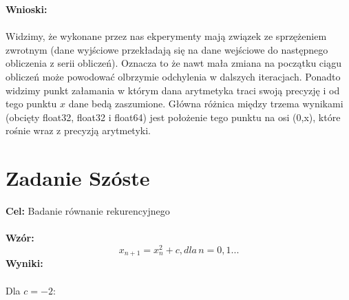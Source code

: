 \documentclass{article}
\begin{document}
\noindent \textbf{Wnioski:} \\\\
Widzimy, że wykonane przez nas ekperymenty mają związek ze sprzężeniem zwrotnym (dane wyjściowe przekładają się na dane wejściowe do następnego obliczenia z serii obliczeń). Oznacza to że nawt mała zmiana na początku ciągu obliczeń może powodować olbrzymie odchylenia w dalszych iteracjach. Ponadto widzimy punkt   załamania  w którym dana arytmetyka traci swoją precyzję i od tego punktu $x$ dane bedą zaszumione. Główna różnica między trzema wynikami (obcięty float32, float32 i float64) jest położenie tego punktu na osi (0,x), które rośnie wraz z precyzją arytmetyki.
\section*{Zadanie Szóste}
\noindent \textbf{Cel:} Badanie równanie rekurencyjnego\\\\
\noindent \textbf{Wzór:}
$$x_{n+1} = x^{2}_{n} +c, dla \, n = 0,1...$$
\newpage
\noindent \textbf{Wyniki:}\\\\
Dla $c = -2$:
\end{document}
